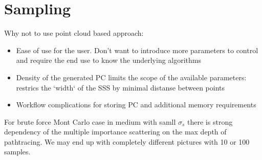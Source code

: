 \section{Sampling}
Why not to use point cloud based approach:
\begin{itemize}
  \item Ease of use for the user. Don't want to introduce more parameters to
  control and require the end use to know the underlying algorithms
  \item{Density of the generated PC limits the scope of the available
  parameters: restrics the `width` of the SSS by minimal distanse between
  points}
  \item{Workflow complications for storing PC and additional memory
  requirements}
\end{itemize}

For brute force Mont Carlo case in medium with samll $\sigma_s$ there is strong
dependency of the multiple importance scattering on the max depth of
pathtracing. We may end up with completely different pictures with 10 or 100
samples.
